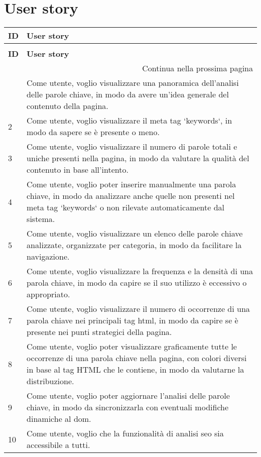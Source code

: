 \newpage

\section{User story}

\renewcommand{\arraystretch}{1.5}
\begin{tabularx}{\textwidth}{lX}
\caption{Tabella delle user story}
\label{tab:user-story} \\
\hline\hline
\textbf{ID} & \textbf{User story}\\
\endfirsthead
    
\caption[]{Tabella delle user story (continua)} \\
\hline\hline
\textbf{ID} & \textbf{User story} \\ 
\endhead
    
\multicolumn{2}{r}{{Continua nella prossima pagina}} \\ 
\endfoot
    
\hline
\endlastfoot

\hline
1 & Come utente, voglio visualizzare una panoramica dell'analisi delle parole chiave, in modo da avere un'idea generale del contenuto della pagina. \\
\hline
2 & Come utente, voglio visualizzare il meta tag `keywords`, in modo da sapere se è presente o meno. \\
\hline
3 & Come utente, voglio visualizzare il numero di parole totali e uniche presenti nella pagina, in modo da valutare la qualità del contenuto in base all'intento. \\
\hline
4 & Come utente, voglio poter inserire manualmente una parola chiave, in modo da analizzare anche quelle non presenti nel meta tag `keywords` o non rilevate automaticamente dal sistema. \\
\hline
5 & Come utente, voglio visualizzare un elenco delle parole chiave analizzate, organizzate per categoria, in modo da facilitare la navigazione. \\
\hline
6 & Come utente, voglio visualizzare la frequenza e la densità di una parola chiave, in modo da capire se il suo utilizzo è eccessivo o appropriato. \\
\hline
7 & Come utente, voglio visualizzare il numero di occorrenze di una parola chiave nei principali tag \gls{html}, in modo da capire se è presente nei punti strategici della pagina. \\
\hline
8 & Come utente, voglio poter visualizzare graficamente tutte le occorrenze di una parola chiave nella pagina, con colori diversi in base al tag HTML che le contiene, in modo da valutarne la distribuzione. \\
\hline
9 & Come utente, voglio poter aggiornare l'analisi delle parole chiave, in modo da sincronizzarla con eventuali modifiche dinamiche al \gls{dom}. \\
\hline
10 & Come utente, voglio che la funzionalità di analisi \gls{seo} sia accessibile a tutti. \\
\end{tabularx}